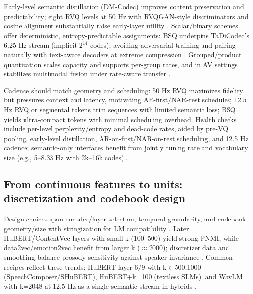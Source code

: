 \documentclass{article}
\begin{document}
Early-level semantic distillation (DM-Codec) improves content preservation and predictability; eight RVQ levels at 50 Hz with RVQGAN-style discriminators and cosine alignment substantially raise early-layer utility \cite{ahasan2025dmcodecdistillingmultimodalrepresentatio}. Scalar/binary schemes offer deterministic, entropy-predictable assignments: BSQ underpins TaDiCodec's 6.25 Hz stream (implicit $2^{14}$ codes), avoiding adversarial training and pairing naturally with text-aware decoders at extreme compression \cite{wang2025tadicodectextawarediffusionspeechtokeniz}. Grouped/product quantization scales capacity and supports per-group rates, and in AV settings stabilizes multimodal fusion under rate-aware transfer \cite{sadok2025vectorquantizedmaskedautoencoderaudiovis}.

Cadence should match geometry and scheduling: 50 Hz RVQ maximizes fidelity but pressures context and latency, motivating AR-first/NAR-rest schedules; 12.5 Hz RVQ or segmental tokens trim sequences with limited semantic loss; BSQ yields ultra-compact tokens with minimal scheduling overhead. Health checks include per-level perplexity/entropy and dead-code rates, aided by pre-VQ pooling, early-level distillation, AR-on-first/NAR-on-rest scheduling, and 12.5 Hz cadence; semantic-only interfaces benefit from jointly tuning rate and vocabulary size (e.g., 5--8.33 Hz with 2k--16k codes) \cite{peng2024mslms2stmultitaskspeechlanguagemodeltext,zeng2024scalingspeechtextpretrainingsyntheticint,yang2025diffsoundstreamefficientspeechtokenizati,wang2025tadicodectextawarediffusionspeechtokeniz,ahasan2025dmcodecdistillingmultimodalrepresentatio,baade2024syllablelmlearningcoarsesemanticunitsspe}.

\subsection{From continuous features to units: discretization and codebook design} \label{subsec:From continuous features to units: discretization and codebook design}
Design choices span encoder/layer selection, temporal granularity, and codebook geometry/size with stringization for LM compatibility \cite{guo2025recentadvancesdiscretespeechtokensreview}. Later HuBERT/ContentVec layers with small k (100--500) yield strong PNMI, while data2vec/emotion2vec benefit from larger k ($\approx$2000); discretizer data and smoothing balance prosody sensitivity against speaker invariance \cite{onda2025benchmarkingprosodyencodingdiscretespeec}. Common recipes reflect these trends: HuBERT layer-6/9 with k$\in${500,1000} (SpeechComposer/SHuBERT), HuBERT+k=100 (textless SLMs), and WavLM with k=2048 at 12.5 Hz as a single semantic stream in hybrids \cite{wu2024speechcomposerunifyingmultiplespeechtask,hsu2024exploringcontextlearningtextlessspeechla,yang2025diffsoundstreamefficientspeechtokenizati}.
\end{document}
